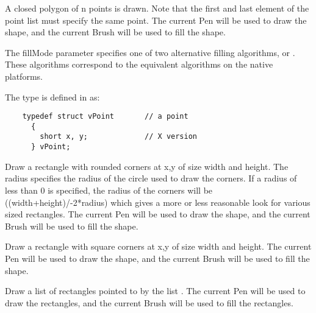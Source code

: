 
A closed polygon of n points is drawn. Note that the
first and last element of the point list must specify
the same point.
The current Pen will be used to draw the shape, and the current
Brush will be used to fill the shape.

The fillMode parameter specifies one of two alternative filling
algorithms,  or . These algorithms correspond
to the equivalent algorithms on the native platforms.

The type  is defined in  as:
\footnotesize
\begin{verbatim}
    typedef struct vPoint       // a point
      {
        short x, y;             // X version
      } vPoint; 
\end{verbatim}
\normalfont\normalsize


Draw a rectangle with rounded corners at x,y of size width and
height. The radius specifies the radius of the circle used to
draw the corners. If a radius of less than 0 is specified, the
radius of the corners will be ((width+height)/-2*radius) which
gives a more or less reasonable look for various sized
rectangles. The current Pen will be used to draw the shape, and
the current Brush will be used to fill the shape.


Draw a rectangle with square corners at x,y of size width and
height. The current Pen will be used to draw the shape, and the
current Brush will be used to fill the shape.


Draw a list of   rectangles pointed to by
the list .
The current Pen will be used to draw the rectangles, and the
current Brush will be used to fill the rectangles.

